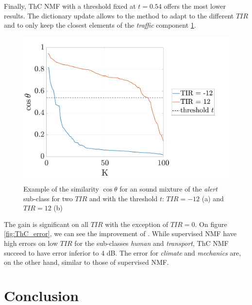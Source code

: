 \documentclass[twocolumn,a4paper,10pt]{article}
\begin{document}
Finally, ThC NMF with a threshold fixed at $t = 0.54$ offers the most lower results. The dictionary update allows to the method to adapt to the different $TIR$ and to only keep the closest elements of the \textit{traffic} component \ref{fig:dist_-12_12}.

\begin{figure}
    \centering
    \includegraphics[width=\linewidth]{../image/dist_-12_12.pdf}    
    \caption{Example of the similarity $\cos \theta$ for an sound mixture of the \textit{alert} sub-class for two $TIR$ and with the threshold $t$: $TIR = -12$ (a) and $TIR = 12$ (b)}
    \label{fig:dist_-12_12}
\end{figure}


The gain is significant on all $TIR$ with the exception of $TIR = 0$. On figure \ref{fig:ThC_error}, we can see the improvement of .
While supervised NMF have high errors on low $TIR$ for the sub-classes \textit{human} and \textit{transport}, ThC NMF succeed to have error inferior to 4 dB. The error for \textit{climate} and \textit{mechanics} are, on the other hand, similar to those of supervised NMF. 

\section{Conclusion}
\footnotesize


\end{document}
